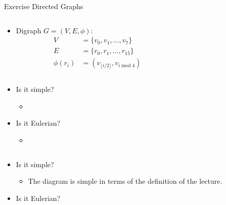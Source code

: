 \begin{frame}[allowframebreaks]{Exercise \thesection}{Directed Graphs}
  \begin{solution}
    \begin{columns}
      \begin{column}{0.5\textwidth}
        \begin{itemize}
          \item Digraph $G=\left(V,E,\phi\right)$:
          \begin{align*}
            V &= \{v_0, v_1, ..., v_7\} \\
            E &= \{r_0, r_1, ..., r_{15} \} \\
            \phi(r_i) &= (v_{\lfloor i / 2\rfloor}, v_{i \; \text{mod} \; 4})
          \end{align*}
        \end{itemize}
      \end{column}
      \begin{column}{0.5\textwidth}
      \end{column}
    \end{columns}
  \end{solution}
  \begin{exercisenoinc}
    \begin{itemize}
      \item Is it simple?
      \begin{itemize}
        \item[]
      \end{itemize}
      \item Is it Eulerian?
      \begin{itemize}
        \item[]
      \end{itemize}
    \end{itemize}
  \end{exercisenoinc}
  \begin{solution}
    \begin{columns}
      \begin{column}{0.5\textwidth}
        \begin{itemize}
          \item Is it simple?
            \begin{itemize}
              \item The diagram is simple in terms of the definition of the lecture.
            \end{itemize}
          \item Is it Eulerian?

\end{itemize}
\end{column}
\end{columns}
\end{solution}
\end{frame}
